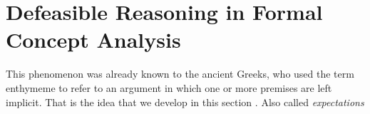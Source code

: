\chapter{Defeasible Reasoning in Formal Concept Analysis}
\label{chapter:defeasible-reasoning-in-fca}

This phenomenon was already known to the ancient Greeks, who used the term enthymeme to refer to an argument in which one or more premises are left implicit. That is the idea that we develop in this section \cite{makinson2003bridges}. Also called \textit{expectations}
